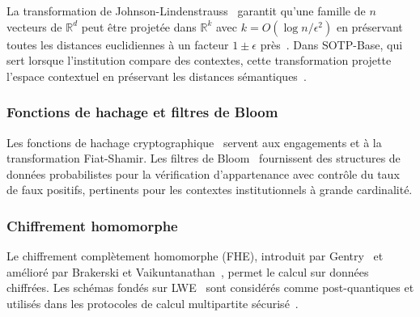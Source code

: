 \begin{sloppypar}
La transformation de Johnson-Lindenstrauss~\cite{JohnsonLindenstrauss84,DasguptaGupta03}
garantit qu'une famille de $n$ vecteurs de $\mathbb{R}^d$
peut \^etre projet\'ee dans $\mathbb{R}^k$ avec $k = O(\log n / \epsilon^2)$
en pr\'eservant toutes les distances euclidiennes \`a un facteur $1 \pm \epsilon$
pr\`es~\cite{Vempala05,Indyk98,Indyk06}. Dans SOTP-Base, qui sert lorsque l'institution compare des contextes, cette transformation
projette l'espace contextuel en pr\'eservant les distances
s\'emantiques~\cite{DasguptaKumar14,Larsen17,Gionis99}.

\subsubsection{Fonctions de hachage et filtres de Bloom}
\label{subsubsec:hachage}

Les fonctions de hachage cryptographique~\cite{Damgard87} servent aux engagements et \`a la transformation Fiat-Shamir. Les filtres de Bloom~\cite{Bloom70} fournissent des structures de donn\'ees probabilistes pour la v\'erification d'appartenance avec contr\^ole du taux de faux positifs, pertinents pour les contextes institutionnels \`a grande cardinalit\'e.

\subsubsection{Chiffrement homomorphe}
\label{subsubsec:fhe}

Le chiffrement compl\`etement homomorphe (FHE), introduit par Gentry~\cite{Gentry09} et am\'elior\'e par Brakerski et Vaikuntanathan~\cite{BrakerskiVaikuntanathan11}, permet le calcul sur donn\'ees chiffr\'ees. Les sch\'emas fond\'es sur LWE~\cite{Regev2009} sont consid\'er\'es comme post-quantiques et utilis\'es dans les protocoles de calcul multipartite s\'ecuris\'e~\cite{Yao82,GMW87,Asharov12}.
\end{sloppypar}

